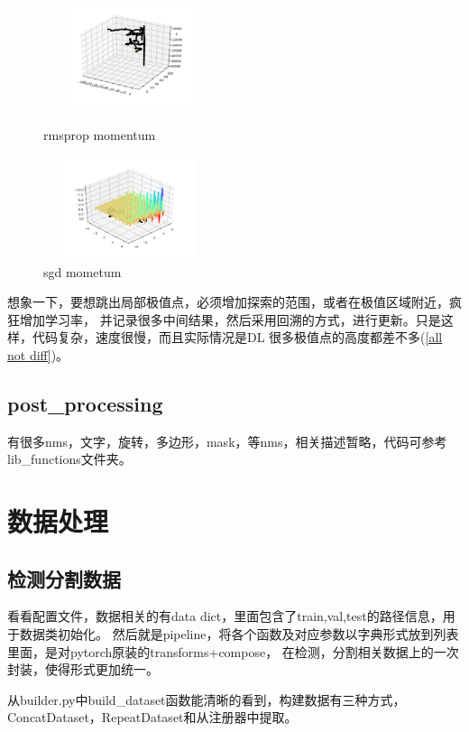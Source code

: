 \documentclass[UTF8]{ctexart}
\begin{document}
\begin{figure}[htbp]
	\centering
	\begin{minipage}[t]{0.48\textwidth}
	\centering
	\includegraphics[width=5cm, height=3cm]{./pic/rmsprop_momentum.png}
	\caption{rmsprop momentum}
	\end{minipage}
	\begin{minipage}[t]{0.48\textwidth}
	\centering
	\includegraphics[width=5cm,height=3cm]{./pic/sgd_mometum.png}
	\caption{sgd mometum}
	\label{decent curve}
	\end{minipage}
\end{figure}

想象一下，要想跳出局部极值点，必须增加探索的范围，或者在极值区域附近，疯狂增加学习率，
并记录很多中间结果，然后采用回溯的方式，进行更新。只是这样，代码复杂，速度很慢，而且实际情况是DL
很多极值点的高度都差不多(\ref{all not diff})。


\subsection{post\_processing}
有很多nms，文字，旋转，多边形，mask，等nms，相关描述暂略，代码可参考lib\_functions文件夹。

\section{数据处理}
\label{sec:detail}
\subsection{检测分割数据}
看看配置文件，数据相关的有data dict，里面包含了train,val,test的路径信息，用于数据类初始化。
然后就是pipeline，将各个函数及对应参数以字典形式放到列表里面，是对pytorch原装的transforms+compose，
在检测，分割相关数据上的一次封装，使得形式更加统一。

从builder.py中build\_dataset函数能清晰的看到，构建数据有三种方式，ConcatDataset，RepeatDataset和从注册器中提取。
\end{document}
